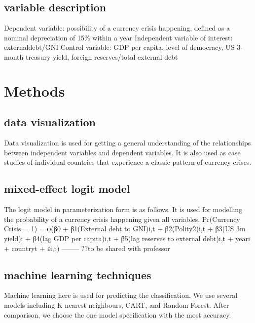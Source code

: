\documentclass[12pt,]{article}
\begin{document}
\subsection{variable description}\label{variable-description}

Dependent variable: possibility of a currency crisis happening, defined
as a nominal depreciation of 15\% within a year Independent variable of
interest: externaldebt/GNI Control variable: GDP per capita, level of
democracy, US 3-month treasury yield, foreign reserves/total external
debt

\section{Methods}\label{methods}

\subsection{data visualization}\label{data-visualization}

Data visualization is used for getting a general understanding of the
relationships between independent variables and dependent variables. It
is also used as case studies of individual countries that experience a
classic pattern of currency crises.

\subsection{mixed-effect logit model}\label{mixed-effect-logit-model}

The logit model in parameterization form is as follows. It is used for
modelling the probability of a currency crisis happening given all
variables. Pr(Currency Crisis = 1) = φ(β0 + β1(External debt to GNI)i,t
+ β2(Polity2)i,t + β3(US 3m yield)i + β4(lag GDP per capita)i,t + β5(lag
reserves to external debt)i,t + yeari + countryt + εi,t) -------- ??to
be shared with professor

\subsection{machine learning
techniques}\label{machine-learning-techniques}

Machine learning here is used for predicting the classification. We use
several models including K nearest neighbours, CART, and Random Forest.
After comparison, we choose the one model specification with the most
accuracy.
\end{document}
